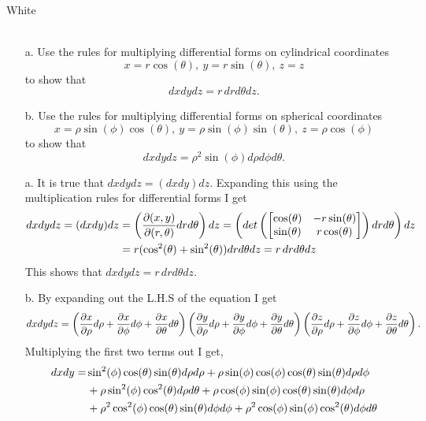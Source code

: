 \documentclass[titlepage]{article}
\begin{document}
\begin{cproblem}{2}{White}\ \\\
\vspace{-1em}
\begin{itemize}
\item[a.] Use the rules for multiplying differential forms on cylindrical coordinates
$$ x = r\cos(\theta), \ y = r\sin(\theta), \ z = z $$
to show that
$$ dxdydz = r\,drd\theta dz.$$
\item[b.] Use the rules for multiplying differential forms on spherical coordinates
$$ x = \rho\sin(\phi)\cos(\theta), \ y = \rho\sin(\phi)\sin(\theta), \ z = \rho\cos(\phi) $$
to show that
$$ dxdydz = \rho^2\sin(\phi)d\rho d\phi d\theta.$$
\end{itemize}
\end{cproblem}
\begin{solution}
\vspace{-2em}
\begin{itemize}
\item[a.] It is true that $dxdydz = (dxdy)dz$. Expanding this using the multiplication rules for differential forms I get
\begin{align*}dxdydz=(dxdy)dz &=  \left(\frac{\p (x,y)}{\p (r,\theta)}drd\theta\right)dz = \left(det\left(\bmat{\cos(\theta) & -r\sin(\theta) \\ \sin(\theta) & r\cos(\theta)}\right)drd\theta\right)dz\\
&= r(\cos^2(\theta) + \sin^2(\theta))drd\theta dz = r\,drd\theta dz
\end{align*}
This shows that $dxdydz = r\,drd\theta dz.$
\item[b.] By expanding out the L.H.S of the equation I get
$$ dxdydz = \left( \frac{\partial x}{\partial \rho} d\rho + \frac{\partial x}{\partial \phi} d\phi + \frac{\partial x}{\partial \theta} d\theta\right)\left( \frac{\partial y}{\partial \rho} d\rho + \frac{\partial y}{\partial \phi} d\phi + \frac{\partial y}{\partial \theta} d\theta\right) \left( \frac{\partial z}{\partial \rho} d\rho + \frac{\partial z}{\partial \phi} d\phi + \frac{\partial z}{\partial \theta} d\theta\right).$$
Multiplying the first two terms out I get,
\begin{align*}
dxdy =& \sin^2(\phi)\cos(\theta)\sin(\theta)d\rho d\rho + \rho\sin(\phi)\cos(\phi)\cos(\theta)\sin(\theta) d\rho d\phi \\
&\,\hspace{-.1em}+ \rho\sin^2(\phi)\cos^2(\theta) d\rho d\theta + \rho \cos(\phi)\sin(\phi)\cos(\theta)\sin(\theta)d\phi d\rho \\
&\, \hspace{-.1em}+ \rho^2 \cos^2(\phi)\cos(\theta)\sin(\theta)d\phi d\phi + \rho^2 \cos(\phi)\sin(\phi)\cos^2(\theta) d\phi d\theta \\

\end{align*}
\end{itemize}
\end{solution}
\end{document}
